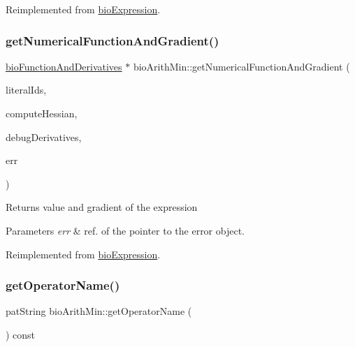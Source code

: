 Reimplemented from \hyperlink{classbio_expression_a3e4b4dca58dbbc6f0e411b30eb3f60b4}{bio\+Expression}.

\mbox{\label{classbio_arith_min_aeeb85ace337c2e2f0b8e6a27a698625a}} 
\subsubsection{\texorpdfstring{get\+Numerical\+Function\+And\+Gradient()}{getNumericalFunctionAndGradient()}}
{\footnotesize\ttfamily \hyperlink{classbio_function_and_derivatives}{bio\+Function\+And\+Derivatives} $\ast$ bio\+Arith\+Min\+::get\+Numerical\+Function\+And\+Gradient (\begin{DoxyParamCaption}\item[{vector$<$ pat\+U\+Long $>$}]{literal\+Ids,  }\item[{pat\+Boolean}]{compute\+Hessian,  }\item[{pat\+Boolean}]{debug\+Derivatives,  }\item[{pat\+Error $\ast$\&}]{err }\end{DoxyParamCaption})\hspace{0.3cm}{\ttfamily [virtual]}}

\begin{DoxyReturn}{Returns}
value and gradient of the expression 
\end{DoxyReturn}

\begin{DoxyParams}{Parameters}
{\em err} & ref. of the pointer to the error object. \\
\hline
\end{DoxyParams}


Reimplemented from \hyperlink{classbio_expression_a91c81ce80c9e972c913b10f5f3c1ed13}{bio\+Expression}.

\mbox{\label{classbio_arith_min_a09b89bea022328daada894ebdf834e5c}} 
\subsubsection{\texorpdfstring{get\+Operator\+Name()}{getOperatorName()}}
{\footnotesize\ttfamily pat\+String bio\+Arith\+Min\+::get\+Operator\+Name (\begin{DoxyParamCaption}{ }\end{DoxyParamCaption}) const\hspace{0.3cm}{\ttfamily [virtual]}}

